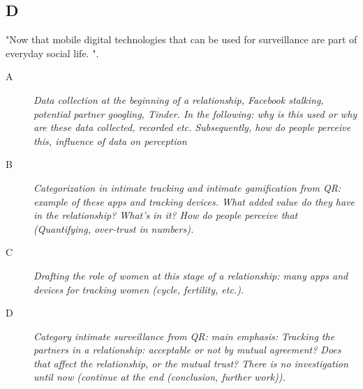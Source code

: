 \subsection{D}
"Now that mobile digital technologies that can be used for surveillance are part of everyday social life. "\cite{doi:10.1080/13691058.2014.920528}.
\label{subsec:D}
\begin{description}
	\item[A] \textit{Data collection at the beginning of a relationship, Facebook stalking, potential partner googling, Tinder. In the following: why is this used or why are these data collected, recorded etc. Subsequently, how do people perceive this, influence of data on perception}
	\item[B] \textit{Categorization in intimate tracking and intimate gamification from \acl{QR}: example of these apps and tracking devices. What added value do they have in the relationship? What's in it? How do people perceive that (Quantifying, over-trust in numbers).}
	\item[C] \textit{Drafting the role of women at this stage of a relationship: many apps and devices for tracking women (cycle, fertility, etc.).}
	\item[D] \textit{Category intimate surveillance from \acl{QR}: main emphasis:
	Tracking the partners in a relationship: acceptable or not by mutual agreement? Does that affect the relationship, or the mutual trust? There is no investigation until now (continue at the end (conclusion, further work)).}
\end{description}